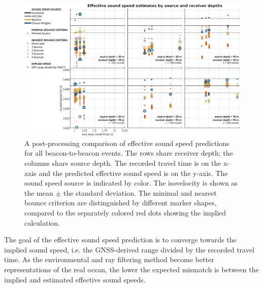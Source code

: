 \begin{figure}[h!]
\includegraphics[width=\columnwidth]{figs/gvel-txrxdepth-wIso-wGPS.pdf}
\caption{A post-processing comparison of effective sound speed predictions for all beacon-to-beacon events. The rows share receiver depth; the columns share source depth. The recorded travel time is on the x-axis and the predicted effective sound speed is on the y-axis. The sound speed source is indicated by color. The isovelocity is shown as the mean $\pm$ the standard deviation. The minimal and nearest bounce criterion are distinguished by different marker shapes, compared to the separately colored red dots showing the implied calculation.}
\label{fig:gvel-post}
\end{figure}

The goal of the effective sound speed prediction is to converge towards the implied sound speed, i.e. the GNSS-derived range divided by the recorded travel time.
As the environmental and ray filtering method become better representations of the real ocean, the lower the expected mismatch is between the implied and estimated effective sound speeds.

